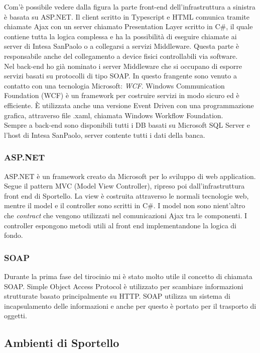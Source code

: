 Com'è possibile vedere dalla figura la parte front-end dell'infrastruttura a sinistra è basata su ASP.NET. Il client scritto in Typescript e HTML comunica tramite chiamate Ajax con un server chiamato Presentation Layer scritto in C\#, il quale contiene tutta la logica complessa e ha la possibilità di eseguire chiamate ai server di Intesa SanPaolo o a collegarsi a servizi Middleware. Questa parte è responsabile anche del collegamento a device fisici controllabili via software. \\
Nel back-end ho già nominato i server Middleware che si occupano di esporre servizi basati su protocolli di tipo SOAP. In questo frangente sono venuto a contatto con una tecnologia Microsoft: \textit{WCF}. Windows Communication Foundation (WCF) è un framework per costruire servizi in modo sicuro ed è efficiente. È utilizzata anche una versione Event Driven con una programmazione grafica, attraverso file .xaml, chiamata Windows Workflow Foundation. \\
Sempre a back-end sono disponibili tutti i DB basati su Microsoft SQL Server e l'host di Intesa SanPaolo, server contente tutti i dati della banca. \\

\subsubsection{ASP.NET}
ASP.NET è un framework creato da Microsoft per lo sviluppo di web application. Segue il pattern MVC (Model View Controller), ripreso poi dall'infrastruttura front end di Sportello. La view è costruita attraverso le normali tecnologie web, mentre il model e il controller sono scritti in C\#. I model non sono nient'altro che \textit{contract} che vengono utilizzati nel comunicazioni Ajax tra le componenti. I controller espongono metodi utili al front end implementandone la logica di fondo.  

\subsubsection{SOAP}
Durante la prima fase del tirocinio mi è stato molto utile il concetto di chiamata SOAP. Simple Object Access Protocol è utilizzato per scambiare informazioni strutturate basato principalmente su HTTP. SOAP utilizza un sistema di incapsulamento delle informazioni e anche per questo è portato per il trasporto di oggetti.

\subsection{Ambienti di Sportello}

